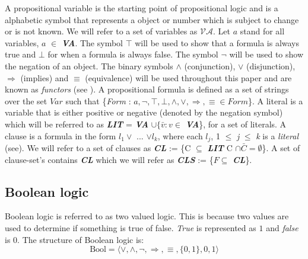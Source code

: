 \documentclass[11pt,a4paper]{report}
\newcommand{\Va}{\mathcal{VA}}
\begin{document}
A propositional variable is the starting point of propositional logic and is a alphabetic symbol that represents a object or number which is subject to change or is not known. We will refer to a set of variables as $\Va$. Let $a$ stand for all variables, $a$ $\in$ \textit{\textbf{VA}}. The symbol $\top$ will be used to show that a formula is always true and $\bot$ for when a formula is always false. The symbol $\neg$ will be used to show the negation of an object. The binary symbols $\land$ (conjunction), $\lor$ (disjunction), $\Rightarrow$ (implies) and $\equiv$ (equivalence) will be used throughout this paper and are known as \textit{functors} (see \cite{Marek2009Introduction}). A propositional formula is defined as a set of strings over the set $Var$ such that \{\textit{Form} : $a, \neg, \top, \bot, \land, \lor, \Rightarrow, \equiv \in Form$\}. A literal is a variable that is either positive or negative (denoted by the negation symbol) which will be referred to as \textbf{\textit{LIT}} =  \textit{\textbf{VA}} $\cup \{ \bar{v} : v \in$ \textbf{\textit{VA}}\}, for a set of literals. A clause is a formula in the form $l_1 \lor$ ... $\lor l_k$, where each $l_j$, 1 $\le$ \textit{j} $\le$ \textit{k} is a \textit{literal} (see\cite{Marek2009Introduction}). We will refer to a set of clauses as \textbf{\textit{CL}} := \{C $\subseteq$ \textbf{\textit{LIT}} C $\cap \bar{C} = \emptyset$\}. A set of clause-set's contains \textbf{\textit{CL}} which we will refer as \textbf{\textit{CLS}} := \{$F \subseteq$ \textit{\textbf{CL}}\}. 

\subsection{Boolean logic}
\label{sec:bool}

Boolean logic is referred to as two valued logic. This is because two values are used to determine if something is true of false. \emph{True} is represented as $1$ and \emph{false} is $0$. The structure of Boolean logic is:
\begin{displaymath}
\text{Bool} = \langle \lor, \land, \neg, \Rightarrow, \equiv,\{0,1\}, 0, 1 \rangle
\end{displaymath}
\end{document}
